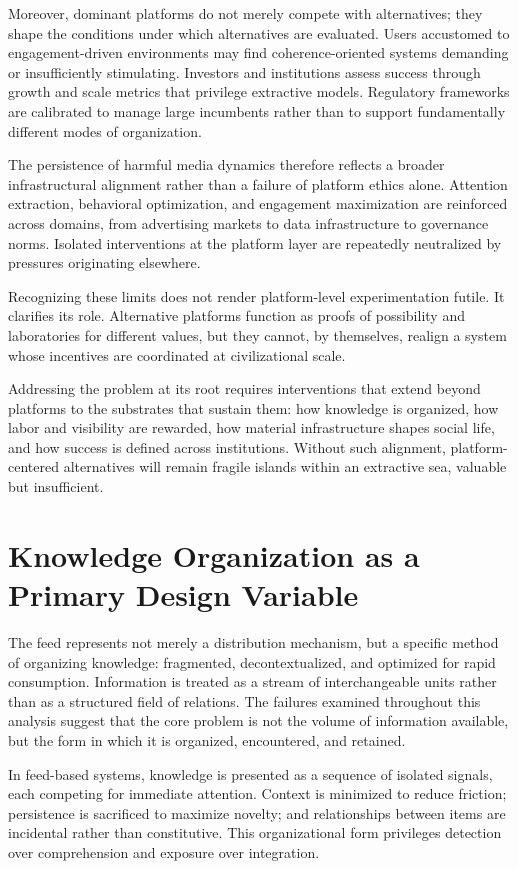 \documentclass[12pt]{article}
\begin{document}
Moreover, dominant platforms do not merely compete with alternatives; they shape the conditions under which alternatives are evaluated. Users accustomed to engagement-driven environments may find coherence-oriented systems demanding or insufficiently stimulating. Investors and institutions assess success through growth and scale metrics that privilege extractive models. Regulatory frameworks are calibrated to manage large incumbents rather than to support fundamentally different modes of organization.

The persistence of harmful media dynamics therefore reflects a broader infrastructural alignment rather than a failure of platform ethics alone. Attention extraction, behavioral optimization, and engagement maximization are reinforced across domains, from advertising markets to data infrastructure to governance norms. Isolated interventions at the platform layer are repeatedly neutralized by pressures originating elsewhere.

Recognizing these limits does not render platform-level experimentation futile. It clarifies its role. Alternative platforms function as proofs of possibility and laboratories for different values, but they cannot, by themselves, realign a system whose incentives are coordinated at civilizational scale.

Addressing the problem at its root requires interventions that extend beyond platforms to the substrates that sustain them: how knowledge is organized, how labor and visibility are rewarded, how material infrastructure shapes social life, and how success is defined across institutions. Without such alignment, platform-centered alternatives will remain fragile islands within an extractive sea, valuable but insufficient.

\section{Knowledge Organization as a Primary Design Variable}

The feed represents not merely a distribution mechanism, but a specific method of organizing knowledge: fragmented, decontextualized, and optimized for rapid consumption. Information is treated as a stream of interchangeable units rather than as a structured field of relations. The failures examined throughout this analysis suggest that the core problem is not the volume of information available, but the form in which it is organized, encountered, and retained.

In feed-based systems, knowledge is presented as a sequence of isolated signals, each competing for immediate attention. Context is minimized to reduce friction; persistence is sacrificed to maximize novelty; and relationships between items are incidental rather than constitutive. This organizational form privileges detection over comprehension and exposure over integration.
\end{document}
